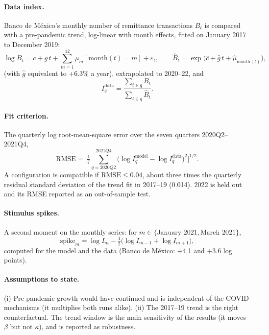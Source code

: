 \documentclass[11pt]{article}
\begin{document}
\paragraph{Data index.} Banco de M\'exico's monthly number of remittance transactions $B_t$ is compared with a pre-pandemic trend, log-linear with month effects, fitted on January 2017 to December 2019:
\begin{equation}
\log B_t = c + g\,t + \sum_{m=1}^{12} \mu_m [\text{month}(t) = m] + \varepsilon_t, \qquad \widehat{B}_t = \exp\Big(\hat c + \hat g\,t + \hat\mu_{\text{month}(t)}\Big),
\end{equation}
(with $\hat g$ equivalent to +6.3\% a year), extrapolated to 2020--22, and
\begin{equation}
I^{\text{data}}_q = \frac{\sum_{t \in q} B_t}{\sum_{t \in q} \widehat{B}_t}.
\end{equation}

\paragraph{Fit criterion.} The quarterly log root-mean-square error over the seven quarters 2020Q2--2021Q4,
\begin{equation}
\text{RMSE} = \Big[\tfrac{1}{7}\textstyle\sum_{q = 2020Q2}^{2021Q4} \big(\log I^{\text{model}}_q - \log I^{\text{data}}_q\big)^2\Big]^{1/2}.
\end{equation}
A configuration is compatible if $\text{RMSE} \le 0.04$, about three times the quarterly residual standard deviation of the trend fit in 2017--19 (0.014). 2022 is held out and its RMSE reported as an out-of-sample test.

\paragraph{Stimulus spikes.} A second moment on the monthly series: for $m \in \{\text{January 2021}, \text{March 2021}\}$,
\begin{equation}
\text{spike}_m = \log I_m - \tfrac{1}{2}\big(\log I_{m-1} + \log I_{m+1}\big),
\end{equation}
computed for the model and the data (Banco de M\'exico: +4.1 and +3.6 log points).

\paragraph{Assumptions to state.} (i) Pre-pandemic growth would have continued and is independent of the COVID mechanisms (it multiplies both runs alike). (ii) The 2017--19 trend is the right counterfactual. The trend window is the main sensitivity of the results (it moves $\beta$ but not $\kappa$), and is reported as robustness.
\end{document}
